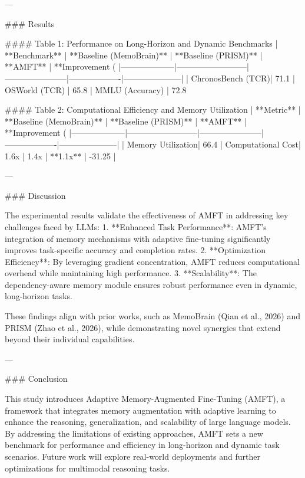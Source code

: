 ---

### Results

#### Table 1: Performance on Long-Horizon and Dynamic Benchmarks
| **Benchmark**     | **Baseline (MemoBrain)** | **Baseline (PRISM)** | **AMFT**          | **Improvement (%
|--------------------|--------------------------|-----------------------|-------------------|---------------------|
| ChronosBench (TCR)| 71.1%
| OSWorld (TCR)     | 65.8%
| MMLU (Accuracy)   | 72.8%

#### Table 2: Computational Efficiency and Memory Utilization
| **Metric**        | **Baseline (MemoBrain)** | **Baseline (PRISM)** | **AMFT**          | **Improvement (%
|--------------------|--------------------------|-----------------------|-------------------|---------------------|
| Memory Utilization| 66.4%
| Computational Cost| 1.6x                     | 1.4x                 | **1.1x**          | -31.25             |

---

### Discussion

The experimental results validate the effectiveness of AMFT in addressing key challenges faced by LLMs:
1. **Enhanced Task Performance**: AMFT's integration of memory mechanisms with adaptive fine-tuning significantly improves task-specific accuracy and completion rates.
2. **Optimization Efficiency**: By leveraging gradient concentration, AMFT reduces computational overhead while maintaining high performance.
3. **Scalability**: The dependency-aware memory module ensures robust performance even in dynamic, long-horizon tasks.

These findings align with prior works, such as MemoBrain (Qian et al., 2026) and PRISM (Zhao et al., 2026), while demonstrating novel synergies that extend beyond their individual capabilities.

---

### Conclusion

This study introduces Adaptive Memory-Augmented Fine-Tuning (AMFT), a framework that integrates memory augmentation with adaptive learning to enhance the reasoning, generalization, and scalability of large language models. By addressing the limitations of existing approaches, AMFT sets a new benchmark for performance and efficiency in long-horizon and dynamic task scenarios. Future work will explore real-world deployments and further optimizations for multimodal reasoning tasks.

